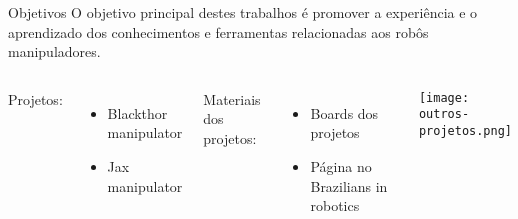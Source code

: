 \begin{frame}[c]{} 
   
    \begin{center}
    \end{center}
       
\end{frame}
%
\begin{frame}[t]{Objetivos} 
   O objetivo principal destes trabalhos é promover a experiência e o aprendizado dos conhecimentos e ferramentas relacionadas aos robôs manipuladores.
   \vspace*{0.3cm}

    \begin{columns}[c]
         Projetos:
         \begin{itemize}
          \item Blackthor manipulator
          \item Jax manipulator
         \end{itemize}
         \vspace*{0.3cm}
         Materiais dos projetos:
            \begin{itemize}
                \item Boards dos projetos
                \item Página no Brazilians in robotics
            \end{itemize}
            \texttt{[image: outros-projetos.png]}
    \end{columns}

\end{frame}
